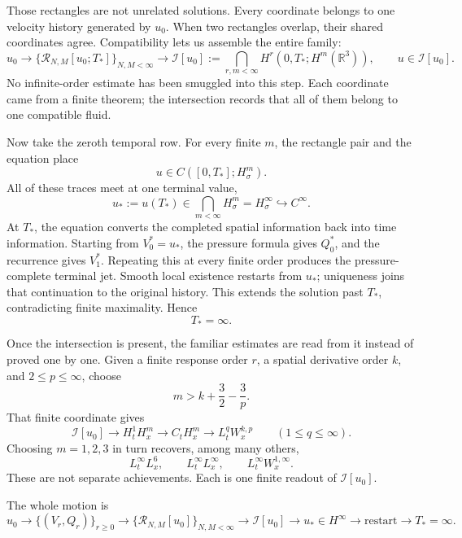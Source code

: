 Those rectangles are not unrelated solutions.  Every coordinate belongs to
one velocity history generated by \(u_0\).  When two rectangles overlap, their
shared coordinates agree.  Compatibility lets us assemble the entire family:
\[
u_0
\longrightarrow
\{\mathcal R_{N,M}[u_0;T_*]\}_{N,M<\infty}
\longrightarrow
\mathcal I[u_0]
:=\bigcap_{r,m<\infty}H^r(0,T_*;H^m(\mathbb R^3)),
\qquad
u\in\mathcal I[u_0].
\]
No infinite-order estimate has been smuggled into this step.  Each coordinate
came from a finite theorem; the intersection records that all of them belong
to one compatible fluid.

Now take the zeroth temporal row.  For every finite \(m\), the rectangle pair
and the equation place
\[
u\in C([0,T_*];H^m_\sigma).
\]
All of these traces meet at one terminal value,
\[
u_*:=u(T_*)
\in\bigcap_{m<\infty}H^m_\sigma
=H^\infty_\sigma
\hookrightarrow C^\infty.
\]
At \(T_*\), the equation converts the completed spatial information back into
time information.  Starting from \(V_0^*=u_*\), the pressure formula gives
\(Q_0^*\), and the recurrence gives \(V_1^*\).  Repeating this at every finite
order produces the pressure-complete terminal jet.  Smooth local existence
restarts from \(u_*\); uniqueness joins that continuation to the original
history.  This extends the solution past \(T_*\), contradicting finite
maximality.  Hence
\[
T_*=\infty.
\]

Once the intersection is present, the familiar estimates are read from it
instead of proved one by one.  Given a finite response order \(r\), a spatial
derivative order \(k\), and \(2\le p\le\infty\), choose
\[
m>k+\frac32-\frac3p.
\]
That finite coordinate gives
\[
\mathcal I[u_0]
\longrightarrow H_t^1H_x^m
\longrightarrow C_tH_x^m
\longrightarrow L_t^qW_x^{k,p}
\qquad(1\le q\le\infty).
\]
Choosing \(m=1,2,3\) in turn recovers, among many others,
\[
L_t^\infty L_x^6,
\qquad
L_t^\infty L_x^\infty,
\qquad
L_t^\infty W_x^{1,\infty}.
\]
These are not separate achievements.  Each is one finite readout of
\(\mathcal I[u_0]\).

The whole motion is
\[
\boxed{
u_0
\longrightarrow \{(V_r,Q_r)\}_{r\ge0}
\longrightarrow \{\mathcal R_{N,M}[u_0]\}_{N,M<\infty}
\longrightarrow \mathcal I[u_0]
\longrightarrow u_*\in H^\infty
\longrightarrow \text{restart}
\longrightarrow T_*=\infty.
}
\]

\endgroup

